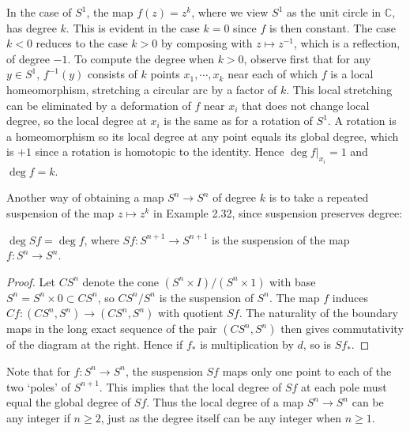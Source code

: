 \begin{example}
\label{ex:degree-suspension}
In the case of $S^1$, the map $f(z) = z^k$, where we view $S^1$ as the unit circle in $\mathbb{C}$, has degree $k$. This is evident in the case $k = 0$ since $f$ is then constant. The case $k < 0$ reduces to the case $k > 0$ by composing with $z \mapsto z^{-1}$, which is a reflection, of degree $-1$. To compute the degree when $k > 0$, observe first that for any $y \in S^1$, $f^{-1}(y)$ consists of $k$ points $x_1, \cdots, x_k$ near each of which $f$ is a local homeomorphism, stretching a circular arc by a factor of $k$. This local stretching can be eliminated by a deformation of $f$ near $x_i$ that does not change local degree, so the local degree at $x_i$ is the same as for a rotation of $S^1$. A rotation is a homeomorphism so its local degree at any point equals its global degree, which is $+1$ since a rotation is homotopic to the identity. Hence $\deg f |_{x_i} = 1$ and $\deg f = k$.
\end{example}

Another way of obtaining a map $S^n \to S^n$ of degree $k$ is to take a repeated suspension of the map $z \mapsto z^k$ in Example 2.32, since suspension preserves degree:

\begin{proposition}
\label{prop:homology-cw-complexes}
$\deg Sf = \deg f$, where $Sf : S^{n+1} \to S^{n+1}$ is the suspension of the map $f : S^n \to S^n$.
\end{proposition}
\begin{proof}
 Let $CS^n$ denote the cone $(S^n \times I)/(S^n \times 1)$ with base $S^n = S^n \times 0 \subset CS^n$, so $CS^n/S^n$ is the suspension of $S^n$. The map $f$ induces $Cf : (CS^n, S^n) \to (CS^n, S^n)$ with quotient $Sf$. The naturality of the boundary maps in the long exact sequence of the pair $(CS^n, S^n)$ then gives commutativity of the diagram at the right. Hence if $f_*$ is multiplication by $d$, so is $Sf_*$.
\end{proof}


Note that for $f : S^n \to S^n$, the suspension $Sf$ maps only one point to each of the two `poles' of $S^{n+1}$. This implies that the local degree of $Sf$ at each pole must equal the global degree of $Sf$. Thus the local degree of a map $S^n \to S^n$ can be any integer if $n \ge 2$, just as the degree itself can be any integer when $n \ge 1$.

